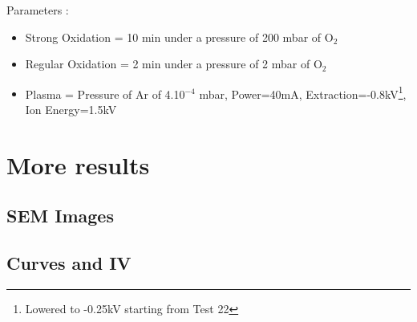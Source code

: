 \noindent Parameters : 
\begin{itemize}
    \item Strong Oxidation = 10 min under a pressure of 200 mbar of O$_2$
    \item Regular Oxidation = 2 min under a pressure of 2 mbar of O$_2$
    \item Plasma = Pressure of Ar of 4.10$^{-4}$ mbar, Power=40mA, Extraction=-0.8kV\footnote{Lowered to -0.25kV starting from Test 22}, Ion Energy=1.5kV 
\end{itemize}

\chapter{More results}

\section{SEM  Images}

\section{Curves and IV}
